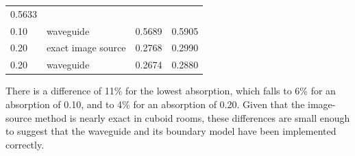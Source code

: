 \documentclass[]{scrreprt}
\begin{document}
\begin{longtable}[c]{@{}llll@{}}
\begin{minipage}[t]{0.22\columnwidth}\raggedright\strut
0.5633
\strut\end{minipage}\tabularnewline
\begin{minipage}[t]{0.22\columnwidth}\raggedright\strut
0.10
\strut\end{minipage} &
\begin{minipage}[t]{0.22\columnwidth}\raggedright\strut
waveguide
\strut\end{minipage} &
\begin{minipage}[t]{0.22\columnwidth}\raggedright\strut
0.5689
\strut\end{minipage} &
\begin{minipage}[t]{0.22\columnwidth}\raggedright\strut
0.5905
\strut\end{minipage}\tabularnewline
\begin{minipage}[t]{0.22\columnwidth}\raggedright\strut
0.20
\strut\end{minipage} &
\begin{minipage}[t]{0.22\columnwidth}\raggedright\strut
exact image source
\strut\end{minipage} &
\begin{minipage}[t]{0.22\columnwidth}\raggedright\strut
0.2768
\strut\end{minipage} &
\begin{minipage}[t]{0.22\columnwidth}\raggedright\strut
0.2990
\strut\end{minipage}\tabularnewline
\begin{minipage}[t]{0.22\columnwidth}\raggedright\strut
0.20
\strut\end{minipage} &
\begin{minipage}[t]{0.22\columnwidth}\raggedright\strut
waveguide
\strut\end{minipage} &
\begin{minipage}[t]{0.22\columnwidth}\raggedright\strut
0.2674
\strut\end{minipage} &
\begin{minipage}[t]{0.22\columnwidth}\raggedright\strut
0.2880
\strut\end{minipage}\tabularnewline
\bottomrule
\end{longtable}

There is a difference of 11\% for the lowest absorption, which falls to
6\% for an absorption of 0.10, and to 4\% for an absorption of 0.20.
Given that the image-source method is nearly exact in cuboid rooms,
these differences are small enough to suggest that the waveguide and its
boundary model have been implemented correctly.
\end{document}
